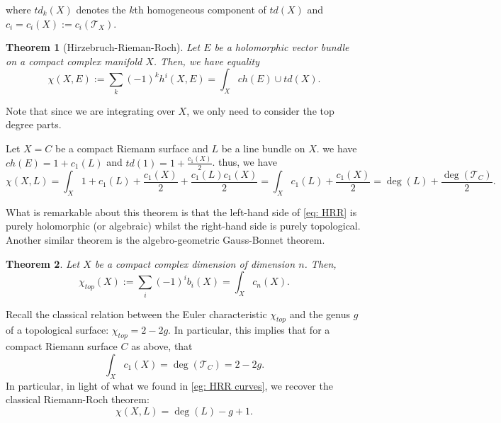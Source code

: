 \documentclass[11pt]{amsart}
\newcommand{\cT}{\mathcal{T}}
\newtheorem{theorem}{Theorem}[subsection]
\theoremstyle{definition}
\numberwithin{equation}{section}
\begin{document}
where $td_k(X)$ denotes the $k$th homogeneous component of $td(X)$ and $c_i=c_i(X):=c_i(\cT_X)$.
\begin{theorem}[Hirzebruch-Rieman-Roch]
	Let $E$ be a holomorphic vector bundle on a compact complex manifold $X$. Then, we have equality
	\begin{equation}
	\chi(X,E):=\sum_k(-1)^k h^i(X,E)=\int_X ch(E)\cup td(X).\label{eq: HRR}
	\end{equation}
\end{theorem}
Note that since we are integrating over $X$, we only need to consider the top degree parts.
\begin{example}\label{eg: HRR curves}
	Let $X=C$ be a compact Riemann surface and $L$ be a line bundle on $X$. we have $ch(E)=1+c_1(L)$ and $td(1)=1+\frac{c_1(X)}{2}$. thus, we have
	\[
	\chi(X,L)=\int_X 1+c_1(L)+\frac{c_1(X)}{2}+\frac{c_1(L)c_1(X)}{2}=\int_X c_1(L)+\frac{c_1(X)}{2}=\deg(L)+\frac{\deg(\cT_C)}{2}.
	\]
\end{example}
What is remarkable about this theorem is that the left-hand side of \eqref{eq: HRR} is purely holomorphic (or algebraic) whilst the right-hand side is purely topological. Another similar theorem is the algebro-geometric Gauss-Bonnet theorem.
\begin{theorem}
	Let $X$ be a compact complex dimension of dimension $n$. Then, 
	\[
	\chi_{top}(X):=\sum_i(-1)^i b_i(X)=\int_Xc_n(X).
	\]
\end{theorem}

Recall the classical relation between the Euler characteristic $\chi_{top}$ and the genus $g$ of a topological surface: $\chi_{top}=2-2g$. In particular, this implies that for a compact Riemann surface $C$ as above, that
 \[
	\int_Xc_1(X)=\deg(\cT_C)=2-2g.
	\]
In particular, in light of what we found in \autoref{eg: HRR curves}, we recover the classical Riemann-Roch theorem:
\[
\chi(X,L)=\deg(L)-g+1.
\]
\end{document}
